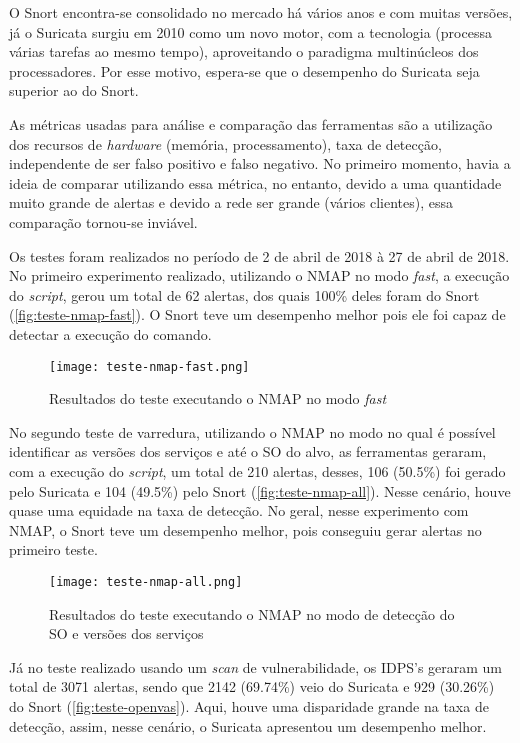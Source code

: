 O Snort encontra-se consolidado no mercado há vários anos e com muitas versões, já o Suricata surgiu em 2010 como um novo motor, com a tecnologia  (processa várias tarefas ao mesmo tempo), aproveitando o paradigma multinúcleos dos processadores. Por esse motivo, espera-se que o desempenho do Suricata seja superior ao do Snort.

As métricas usadas para análise e comparação das ferramentas são a utilização dos recursos de \textit{hardware} (memória, processamento), taxa de detecção, independente de ser falso positivo e falso negativo. No primeiro momento, havia a ideia de comparar utilizando essa métrica, no entanto, devido a uma quantidade muito grande de alertas e devido a rede ser grande (vários clientes), essa comparação tornou-se inviável. 


Os testes foram realizados no período de 2 de abril de 2018 à 27 de abril de 2018. No primeiro experimento realizado, utilizando o NMAP no modo \textit{fast}, a execução do \textit{script}, gerou um total de 62 alertas, dos quais 100\% deles foram do Snort (\autoref{fig:teste-nmap-fast}). O Snort teve um desempenho melhor pois ele foi capaz de detectar a execução do comando.

\begin{figure}[!htb]
    \centering
    \caption{Resultados do teste executando o NMAP no modo \textit{fast}}
    \texttt{[image: teste-nmap-fast.png]}
    \label{fig:teste-nmap-fast}
\end{figure}

No segundo teste de varredura, utilizando o NMAP no modo no qual é possível identificar as versões dos serviços e até o SO do alvo, as ferramentas geraram, com a execução do \textit{script}, um total de 210 alertas, desses, 106 (50.5\%) foi gerado pelo Suricata e 104 (49.5\%) pelo Snort (\autoref{fig:teste-nmap-all}). Nesse cenário, houve quase uma equidade na taxa de detecção. No geral, nesse experimento com NMAP, o Snort teve um desempenho melhor, pois conseguiu gerar alertas no primeiro teste.

\begin{figure}[!htb]
    \centering
    \caption{Resultados do teste executando o NMAP no modo de detecção do SO e versões dos serviços}
    \texttt{[image: teste-nmap-all.png]}
    \label{fig:teste-nmap-all}
\end{figure}

Já no teste realizado usando um \textit{scan} de vulnerabilidade, os IDPS's geraram um total de 3071 alertas, sendo que 2142 (69.74\%) veio do Suricata e 929 (30.26\%) do Snort (\autoref{fig:teste-openvas}). Aqui, houve uma disparidade grande na taxa de detecção, assim, nesse cenário, o Suricata apresentou um desempenho melhor.

